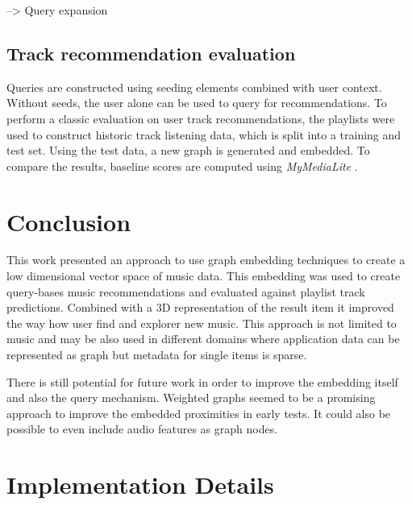 \documentclass[a4paper]{llncs}
\begin{document}
	--> Query expansion
	
	
	
	
	\subsection{Track recommendation evaluation}
	\label{subsec:track_rec_eval}
	Queries are constructed using seeding elements combined with user context. Without seeds, the user alone can be used to query for recommendations. To perform a classic evaluation on user track recommendations, the playlists were used to construct historic track listening data, which is split into a training and test set. Using the test data, a new graph is generated and embedded. To compare the results, baseline scores are computed using \emph{MyMediaLite} \cite{Gantner2011MyMediaLite}.
	
	
	
	
	
	\section{Conclusion}
	This work presented an approach to use graph embedding techniques to create a low dimensional vector space of music data. This embedding was used to create query-bases music recommendations and evaluated against playlist track predictions. Combined with a 3D representation of the result item it improved the way how user find and explorer new music. 
	This approach is not limited to music and may be also used in different domains where application data can be represented as graph but metadata for single items is sparse.
	
	There is still potential for future work in order to improve the embedding itself and also the query mechanism. Weighted graphs seemed to be a promising approach to improve the embedded proximities in early tests. It could also be possible to even include audio features as graph nodes.
	
	
	


	\newpage
	\appendix
	\section{Implementation Details}
	
\end{document}
